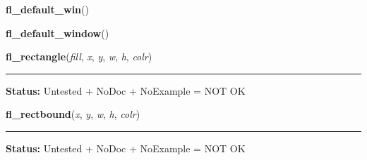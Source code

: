 \hspace{.8\funcindent}\begin{boxedminipage}{\funcwidth}

    \raggedright \textbf{fl\_default\_win}()

\setlength{\parskip}{2ex}
\setlength{\parskip}{1ex}
    \end{boxedminipage}

    \label{xformslib:library:fl_default_window}

    \vspace{0.5ex}

\hspace{.8\funcindent}\begin{boxedminipage}{\funcwidth}

    \raggedright \textbf{fl\_default\_window}()

\setlength{\parskip}{2ex}
\setlength{\parskip}{1ex}
    \end{boxedminipage}

    \label{xformslib:library:fl_rectangle}

    \vspace{0.5ex}

\hspace{.8\funcindent}\begin{boxedminipage}{\funcwidth}

    \raggedright \textbf{fl\_rectangle}(\textit{fill}, \textit{x}, \textit{y}, \textit{w}, \textit{h}, \textit{colr})

    \vspace{-1.5ex}

    \rule{\textwidth}{0.5\fboxrule}
\setlength{\parskip}{2ex}
\setlength{\parskip}{1ex}
\textbf{Status:} Untested + NoDoc + NoExample = NOT OK



    \end{boxedminipage}

    \label{xformslib:library:fl_rectbound}

    \vspace{0.5ex}

\hspace{.8\funcindent}\begin{boxedminipage}{\funcwidth}

    \raggedright \textbf{fl\_rectbound}(\textit{x}, \textit{y}, \textit{w}, \textit{h}, \textit{colr})

    \vspace{-1.5ex}

    \rule{\textwidth}{0.5\fboxrule}
\setlength{\parskip}{2ex}
\setlength{\parskip}{1ex}
\textbf{Status:} Untested + NoDoc + NoExample = NOT OK



    \end{boxedminipage}

